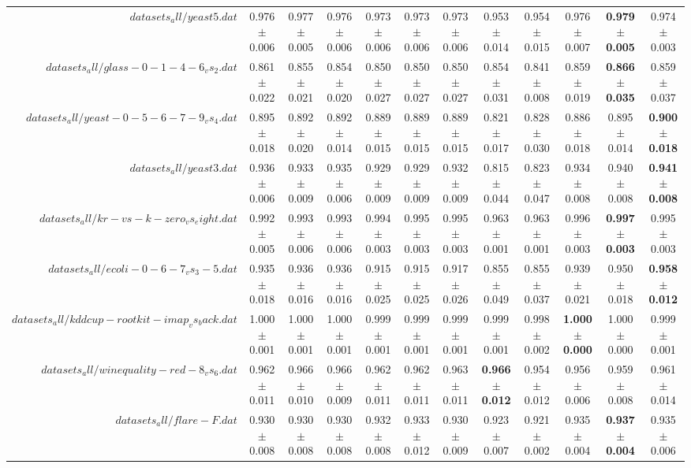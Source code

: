 \begin{table}[!ht]
{\begin{tabular}{r c c c c c c c c c c c}
$datasets_all/yeast5.dat$ & 0.976 $\pm$ 0.006 & 0.977 $\pm$ 0.005 & 0.976 $\pm$ 0.006 & 0.973 $\pm$ 0.006 & 0.973 $\pm$ 0.006 & 0.973 $\pm$ 0.006 & 0.953 $\pm$ 0.014 & 0.954 $\pm$ 0.015 & 0.976 $\pm$ 0.007 & \textbf{0.979 $\pm$ 0.005} & 0.974 $\pm$ 0.003 \\
$datasets_all/glass-0-1-4-6_vs_2.dat$ & 0.861 $\pm$ 0.022 & 0.855 $\pm$ 0.021 & 0.854 $\pm$ 0.020 & 0.850 $\pm$ 0.027 & 0.850 $\pm$ 0.027 & 0.850 $\pm$ 0.027 & 0.854 $\pm$ 0.031 & 0.841 $\pm$ 0.008 & 0.859 $\pm$ 0.019 & \textbf{0.866 $\pm$ 0.035} & 0.859 $\pm$ 0.037 \\
$datasets_all/yeast-0-5-6-7-9_vs_4.dat$ & 0.895 $\pm$ 0.018 & 0.892 $\pm$ 0.020 & 0.892 $\pm$ 0.014 & 0.889 $\pm$ 0.015 & 0.889 $\pm$ 0.015 & 0.889 $\pm$ 0.015 & 0.821 $\pm$ 0.017 & 0.828 $\pm$ 0.030 & 0.886 $\pm$ 0.018 & 0.895 $\pm$ 0.014 & \textbf{0.900 $\pm$ 0.018} \\
$datasets_all/yeast3.dat$ & 0.936 $\pm$ 0.006 & 0.933 $\pm$ 0.009 & 0.935 $\pm$ 0.006 & 0.929 $\pm$ 0.009 & 0.929 $\pm$ 0.009 & 0.932 $\pm$ 0.009 & 0.815 $\pm$ 0.044 & 0.823 $\pm$ 0.047 & 0.934 $\pm$ 0.008 & 0.940 $\pm$ 0.008 & \textbf{0.941 $\pm$ 0.008} \\
$datasets_all/kr-vs-k-zero_vs_eight.dat$ & 0.992 $\pm$ 0.005 & 0.993 $\pm$ 0.006 & 0.993 $\pm$ 0.006 & 0.994 $\pm$ 0.003 & 0.995 $\pm$ 0.003 & 0.995 $\pm$ 0.003 & 0.963 $\pm$ 0.001 & 0.963 $\pm$ 0.001 & 0.996 $\pm$ 0.003 & \textbf{0.997 $\pm$ 0.003} & 0.995 $\pm$ 0.003 \\
$datasets_all/ecoli-0-6-7_vs_3-5.dat$ & 0.935 $\pm$ 0.018 & 0.936 $\pm$ 0.016 & 0.936 $\pm$ 0.016 & 0.915 $\pm$ 0.025 & 0.915 $\pm$ 0.025 & 0.917 $\pm$ 0.026 & 0.855 $\pm$ 0.049 & 0.855 $\pm$ 0.037 & 0.939 $\pm$ 0.021 & 0.950 $\pm$ 0.018 & \textbf{0.958 $\pm$ 0.012} \\
$datasets_all/kddcup-rootkit-imap_vs_back.dat$ & 1.000 $\pm$ 0.001 & 1.000 $\pm$ 0.001 & 1.000 $\pm$ 0.001 & 0.999 $\pm$ 0.001 & 0.999 $\pm$ 0.001 & 0.999 $\pm$ 0.001 & 0.999 $\pm$ 0.001 & 0.998 $\pm$ 0.002 & \textbf{1.000 $\pm$ 0.000} & 1.000 $\pm$ 0.000 & 0.999 $\pm$ 0.001 \\
$datasets_all/winequality-red-8_vs_6.dat$ & 0.962 $\pm$ 0.011 & 0.966 $\pm$ 0.010 & 0.966 $\pm$ 0.009 & 0.962 $\pm$ 0.011 & 0.962 $\pm$ 0.011 & 0.963 $\pm$ 0.011 & \textbf{0.966 $\pm$ 0.012} & 0.954 $\pm$ 0.012 & 0.956 $\pm$ 0.006 & 0.959 $\pm$ 0.008 & 0.961 $\pm$ 0.014 \\
$datasets_all/flare-F.dat$ & 0.930 $\pm$ 0.008 & 0.930 $\pm$ 0.008 & 0.930 $\pm$ 0.008 & 0.932 $\pm$ 0.008 & 0.933 $\pm$ 0.012 & 0.930 $\pm$ 0.009 & 0.923 $\pm$ 0.007 & 0.921 $\pm$ 0.002 & 0.935 $\pm$ 0.004 & \textbf{0.937 $\pm$ 0.004} & 0.935 $\pm$ 0.006 \\

\end{tabular}}
\end{table}
